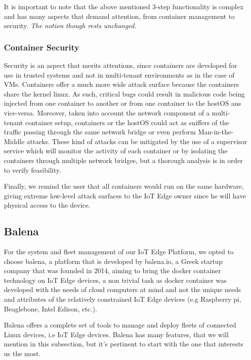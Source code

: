 It is important to note that the above mentioned 3-step functionality is complex and has many aspects that demand attention, from container management to security. \textit{The notion though rests unchanged.} 

\subsubsection{Container Security}

Security is an aspect that merits attentions, since containers are developed for use in trusted systems and not in multi-tenant environments as in the case of VMs. Containers offer a much more wide attack surface because the containers share the kernel linux. As such, critical bugs could result in malicious code being injected from one container to another or from one container to the hostOS ans vice-versa. Moreover, taken into account the network component of a multi-tenant container setup, containers or the hostOS could act as sniffers of the traffic passing through the same network bridge or even perform Man-in-the-Middle attacks. These kind of attacks can be mitigated by the use of a supervisor service which will monitor the activity of each container or by isolating the containers through multiple network bridges, but a thorough analysis is in order to verify feasibility.

Finally, we remind the user that all containers would run on the same hardware, giving extreme low-level attack surfaces to the IoT Edge owner since he will have physical access to the device.

\subsection{Balena}

For the system and fleet management of our IoT Edge Platform, we opted to choose balena\cite{balena}, a platform that is developed by balena.io, a Greek startup company that was founded in 2014, aiming to bring the docker container technology on IoT Edge devices, a non trivial task as docker container was developed with the needs of cloud computers at mind and not the unique needs and attributes of the relatively constrained IoT Edge devices (e.g Raspberry pi, Beaglebone, Intel Edison, etc.).

Balena offers a complete set of tools to manage and deploy fleets of connected Linux devices, i.e IoT Edge devices. Balena has many features, that we will mention in this subsection, but it’s pertinent to start with the one that interests us the most.

